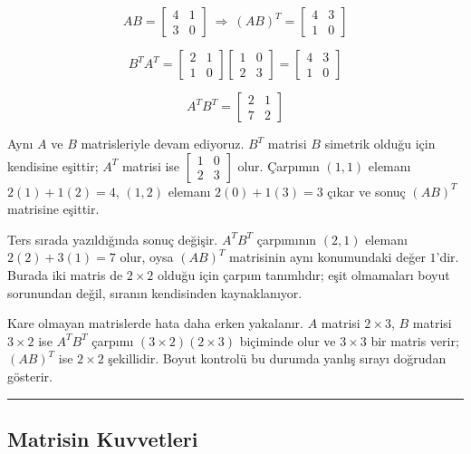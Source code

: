 \documentclass[
  letterpaper,
  DIV=11,
  numbers=noendperiod]{scrartcl}
\begin{document}
\[
AB=\begin{bmatrix}4&1\\3&0\end{bmatrix}
\ \Longrightarrow\
(AB)^T=\begin{bmatrix}4&3\\1&0\end{bmatrix}
\]

\[
B^TA^T=
\begin{bmatrix}2&1\\1&0\end{bmatrix}
\begin{bmatrix}1&0\\2&3\end{bmatrix}
=\begin{bmatrix}4&3\\1&0\end{bmatrix}
\]

\[
A^TB^T=\begin{bmatrix}2&1\\7&2\end{bmatrix}
\]

Aynı \(A\) ve \(B\) matrisleriyle devam ediyoruz. \(B^T\) matrisi \(B\)
simetrik olduğu için kendisine eşittir; \(A^T\) matrisi ise
\(\begin{bmatrix}1&0\\2&3\end{bmatrix}\) olur. Çarpımın \((1,1)\)
elemanı \(2(1)+1(2)=4\), \((1,2)\) elemanı \(2(0)+1(3)=3\) çıkar ve
sonuç \((AB)^T\) matrisine eşittir.

Ters sırada yazıldığında sonuç değişir. \(A^TB^T\) çarpımının \((2,1)\)
elemanı \(2(2)+3(1)=7\) olur, oysa \((AB)^T\) matrisinin aynı
konumundaki değer \(1\)'dir. Burada iki matris de \(2\times2\) olduğu
için çarpım tanımlıdır; eşit olmamaları boyut sorunundan değil, sıranın
kendisinden kaynaklanıyor.

Kare olmayan matrislerde hata daha erken yakalanır. \(A\) matrisi
\(2\times3\), \(B\) matrisi \(3\times2\) ise \(A^TB^T\) çarpımı
\((3\times2)(2\times3)\) biçiminde olur ve \(3\times3\) bir matris
verir; \((AB)^T\) ise \(2\times2\) şekillidir. Boyut kontrolü bu durumda
yanlış sırayı doğrudan gösterir.

\begin{center}\rule{0.5\linewidth}{0.5pt}\end{center}

\subsection{Matrisin Kuvvetleri}\label{matrisin-kuvvetleri}
\end{document}
